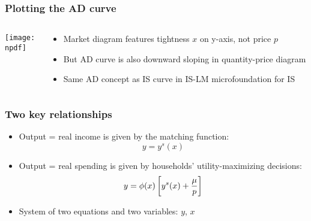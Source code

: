 \documentclass[11pt,aspectratio=169,xcolor={dvipsnames},hyperref={pdftex,pdfpagemode=UseNone,hidelinks,pdfdisplaydoctitle=true},usepdftitle=false]{beamer}
\newcommand{\npdf}{../figures/figures2.pdf}
\begin{document}
\begin{frame}
\frametitle{Plotting the AD curve}
\begin{columns}
\begin{column}{0.6\textwidth}
\texttt{[image: \\npdf]}%
\end{column}
\begin{column}{0.4\textwidth}
\begin{itemize}
	\item Market diagram features tightness $x$ on y-axis, not price $p$
	\item But AD curve is also downward sloping in quantity-price diagram
	\item Same AD concept as IS curve in IS-LM \then microfoundation for IS
\end{itemize}
\end{column}
\end{columns} 
\end{frame}

\begin{frame}
\end{frame}

\begin{frame}
\frametitle{Two key relationships}
\begin{itemize}
\item Output = real income is given by the matching function:
\begin{equation*}
y = y^s(x)
\end{equation*}
\item Output = real spending is given by households' utility-maximizing decisions:
\begin{equation*}
y = \phi(x)\left[  y^s(x) + \frac{\mu}{p} \right]
\end{equation*}
\item System of two equations and two variables: $y$, $x$
\end{itemize}	
\end{frame}
\end{document}
